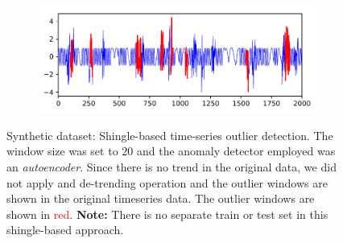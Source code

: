 \documentclass{article} %
\begin{document}
\begin{figure}
	\centering
	\captionsetup{labelformat=empty}
	\begin{subfigure}[b]{1.0\textwidth}
		\includegraphics[width=\textwidth, clip=true, trim=0mm 0mm 0mm 0mm]{timeseries_shingles_synthetic_w20_autoenc}
		\label{fig:autoenc}
	\end{subfigure}
    \caption{Synthetic dataset: Shingle-based time-series outlier detection. The window size was set to $20$ and the anomaly detector employed was an \textit{autoencoder}. Since there is no trend in the original data, we did not apply and de-trending operation and the outlier windows are shown in the original timeseries data. The outlier windows are shown in \textcolor{red}{red}. \textbf{Note:} There is no separate train or test set in this shingle-based approach.}
	\label{fig:synthetic}
\end{figure}
\end{document}
